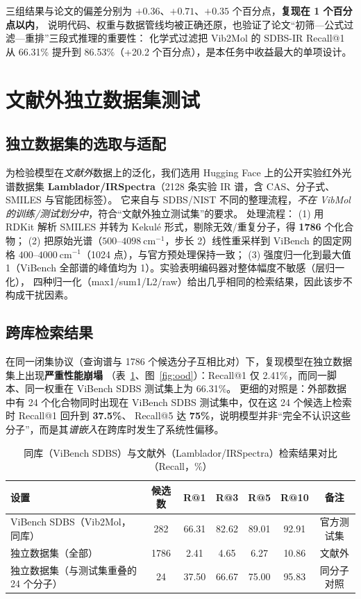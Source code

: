 \documentclass[UTF8,a4paper,11pt]{ctexart}
\begin{document}
三组结果与论文的偏差分别为 $+0.36$、$+0.71$、$+0.35$ 个百分点，\textbf{复现在 1 个百分点以内}，
说明代码、权重与数据管线均被正确还原，也验证了论文“初筛—公式过滤—重排”三段式推理的重要性：
化学式过滤把 Vib2Mol 的 SDBS-IR Recall@1 从 66.31\% 提升到 86.53\%（+20.2 个百分点），是本任务中收益最大的单项设计。

\section{文献外独立数据集测试}
\label{sec:ood}

\subsection{独立数据集的选取与适配}
为检验模型在\emph{文献外}数据上的泛化，我们选用 Hugging Face 上的公开实验红外光谱数据集
\textbf{Lamblador/IRSpectra}（2128 条实验 IR 谱，含 CAS、分子式、SMILES 与官能团标签）。
它来自与 SDBS/NIST 不同的整理流程，\emph{不在 VibMol 的训练/测试划分中}，符合“文献外独立测试集”的要求。
处理流程：
(1) 用 RDKit 解析 SMILES 并转为 Kekulé 形式，剔除无效/重复分子，得 \textbf{1786} 个化合物；
(2) 把原始光谱（$500$--$4098\ \mathrm{cm}^{-1}$，步长 2）线性重采样到 ViBench 的固定网格
$400$--$4000\ \mathrm{cm}^{-1}$（1024 点），与官方预处理保持一致；
(3) 强度归一化到最大值 1（ViBench 全部谱的峰值均为 1）。实验表明编码器对整体幅度不敏感（层归一化），
四种归一化（max1/sum1/L2/raw）给出几乎相同的检索结果，因此该步不构成干扰因素。

\subsection{跨库检索结果}
在同一闭集协议（查询谱与 1786 个候选分子互相比对）下，复现模型在独立数据集上出现\textbf{严重性能崩塌}
（表~\ref{tab:ood}、图~\ref{fig:ood}）：Recall@1 仅 2.41\%，而同一脚本、同一权重在 ViBench SDBS 测试集上为 66.31\%。
更细的对照是：外部数据中有 24 个化合物同时出现在 ViBench SDBS 测试集中，仅在这 24 个候选上检索时 Recall@1 回升到 \textbf{37.5\%}、
Recall@5 达 \textbf{75\%}，说明模型并非“完全不认识这些分子”，而是其\emph{谱嵌入}在跨库时发生了系统性偏移。

\begin{table}[H]
\centering\small
\caption{同库（ViBench SDBS）与文献外（Lamblador/IRSpectra）检索结果对比（Recall，\%）}
\label{tab:ood}
\begin{tabular}{@{}lcccccc@{}}
\toprule
设置 & 候选数 & R@1 & R@3 & R@5 & R@10 & 备注\\
\midrule
ViBench SDBS（Vib2Mol，同库） & 282 & 66.31 & 82.62 & 89.01 & 92.91 & 官方测试集\\
独立数据集（全部） & 1786 & 2.41 & 4.65 & 6.27 & 10.86 & 文献外\\
独立数据集（与测试集重叠的 24 个分子） & 24 & 37.50 & 66.67 & 75.00 & 95.83 & 同分子对照\\
\bottomrule
\end{tabular}
\end{table}
\end{document}
